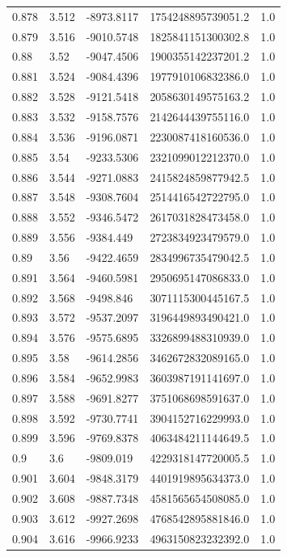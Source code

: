 \begin{tabular}{lllll}
0.878 & 3.512 & -8973.8117 & 1754248895739051.2 & 1.0 \\
0.879 & 3.516 & -9010.5748 & 1825841151300302.8 & 1.0 \\
0.88 & 3.52 & -9047.4506 & 1900355142237201.2 & 1.0 \\
0.881 & 3.524 & -9084.4396 & 1977910106832386.0 & 1.0 \\
0.882 & 3.528 & -9121.5418 & 2058630149575163.2 & 1.0 \\
0.883 & 3.532 & -9158.7576 & 2142644439755116.0 & 1.0 \\
0.884 & 3.536 & -9196.0871 & 2230087418160536.0 & 1.0 \\
0.885 & 3.54 & -9233.5306 & 2321099012212370.0 & 1.0 \\
0.886 & 3.544 & -9271.0883 & 2415824859877942.5 & 1.0 \\
0.887 & 3.548 & -9308.7604 & 2514416542722795.0 & 1.0 \\
0.888 & 3.552 & -9346.5472 & 2617031828473458.0 & 1.0 \\
0.889 & 3.556 & -9384.449 & 2723834923479579.0 & 1.0 \\
0.89 & 3.56 & -9422.4659 & 2834996735479042.5 & 1.0 \\
0.891 & 3.564 & -9460.5981 & 2950695147086833.0 & 1.0 \\
0.892 & 3.568 & -9498.846 & 3071115300445167.5 & 1.0 \\
0.893 & 3.572 & -9537.2097 & 3196449893490421.0 & 1.0 \\
0.894 & 3.576 & -9575.6895 & 3326899488310939.0 & 1.0 \\
0.895 & 3.58 & -9614.2856 & 3462672832089165.0 & 1.0 \\
0.896 & 3.584 & -9652.9983 & 3603987191141697.0 & 1.0 \\
0.897 & 3.588 & -9691.8277 & 3751068698591637.0 & 1.0 \\
0.898 & 3.592 & -9730.7741 & 3904152716229993.0 & 1.0 \\
0.899 & 3.596 & -9769.8378 & 4063484211144649.5 & 1.0 \\
0.9 & 3.6 & -9809.019 & 4229318147720005.5 & 1.0 \\
0.901 & 3.604 & -9848.3179 & 4401919895634373.0 & 1.0 \\
0.902 & 3.608 & -9887.7348 & 4581565654508085.0 & 1.0 \\
0.903 & 3.612 & -9927.2698 & 4768542895881846.0 & 1.0 \\
0.904 & 3.616 & -9966.9233 & 4963150823232392.0 & 1.0 \\

\end{tabular}

